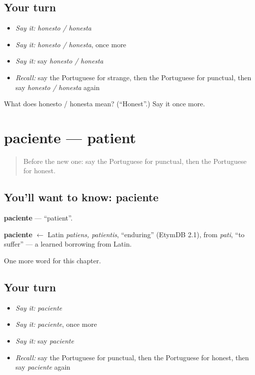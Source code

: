 \subsection*{Your turn}
\begin{itemize}
\raggedright
  \item \emph{Say it:} \emph{honesto / honesta}
  \item \emph{Say it:} \emph{honesto / honesta}, once more
  \item \emph{Say it:} say \emph{honesto / honesta}
  \item \emph{Recall:} say the Portuguese for strange, then the Portuguese for punctual, then say \emph{honesto / honesta} again
\end{itemize}

\begin{tcolorbox}[breakable,colback=teal!4,colframe=teal!35!black,title={Before you move on}]
What does honesto / honesta mean? (\textquotedblleft{}Honest\textquotedblright{}.) Say it once more.
\end{tcolorbox}
\section[paciente]{paciente — patient}

\label{lesson:PT-C155-paciente}



\begin{quote}
Before the new one: say the Portuguese for punctual, then the Portuguese for honest.
\end{quote}

\subsection*{You'll want to know: paciente}
\textbf{paciente} — \textquotedblleft{}patient\textquotedblright{}.

\begin{cousinweb}
\textbf{paciente} $\leftarrow$ Latin \emph{patiens, patientis}, \textquotedblleft{}enduring\textquotedblright{} (EtymDB 2.1), from \emph{pati}, \textquotedblleft{}to suffer\textquotedblright{} — a learned borrowing from Latin.
\end{cousinweb}

\begin{grammarlens}[title={What you've built}]
One more word for this chapter.
\end{grammarlens}

\subsection*{Your turn}
\begin{itemize}
\raggedright
  \item \emph{Say it:} \emph{paciente}
  \item \emph{Say it:} \emph{paciente}, once more
  \item \emph{Say it:} say \emph{paciente}
  \item \emph{Recall:} say the Portuguese for punctual, then the Portuguese for honest, then say \emph{paciente} again
\end{itemize}

